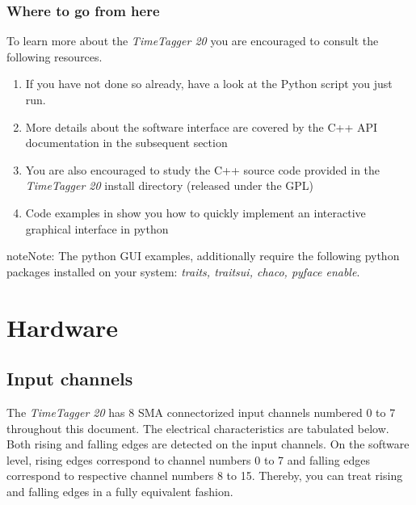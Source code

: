 \documentclass[letterpaper,10pt,english]{sphinxmanual}
\begin{document}
\subsection{Where to go from here}
\label{sections/gettingStarted:where-to-go-from-here}
To learn more about the \emph{TimeTagger 20} you are encouraged to consult the following resources.
\begin{enumerate}
\item {} 
If you have not done so already, have a look at the Python script you just run.

\item {} 
More details about the software interface are covered by the C++ API documentation in the subsequent section

\item {} 
You are also encouraged to study the C++ source code provided in the \emph{TimeTagger 20} install directory (released under the GPL)

\item {} 
Code examples in  show you how to quickly implement an interactive graphical interface in python

\end{enumerate}

\begin{notice}{note}{Note:}
The python GUI examples, additionally require the following python packages installed on your system: \emph{traits, traitsui, chaco, pyface enable}.
\end{notice}


\chapter{Hardware}
\label{sections/hardware:hardware}\label{sections/hardware::doc}

\section{Input channels}
\label{sections/hardware:input-channels}
The \emph{TimeTagger 20} has 8 SMA connectorized input channels numbered 0 to 7 throughout this document. The electrical
characteristics are tabulated below. Both rising and falling edges are detected on the input channels.
On the software level, rising edges correspond to channel numbers 0 to 7 and falling edges correspond to
respective channel numbers 8 to 15. Thereby, you can treat rising and falling edges in a fully equivalent fashion.
\end{document}
